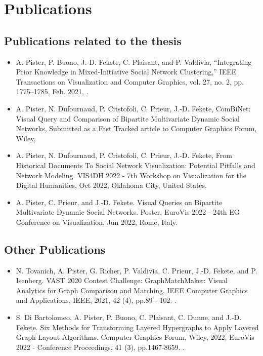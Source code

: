 \chapter*{Publications}

\section*{Publications related to the thesis}

\begin{itemize}
    \item A. Pister, P. Buono, J.-D. Fekete, C. Plaisant, and P. Valdivia, “Integrating Prior Knowledge in Mixed-Initiative Social Network Clustering,” IEEE Transactions on Visualization and Computer Graphics, vol. 27, no. 2, pp. 1775–1785, Feb. 2021, .
    \item A. Pister, N. Dufournaud, P. Cristofoli, C. Prieur, J.-D. Fekete, ComBiNet: Visual Query and Comparison of Bipartite Multivariate Dynamic Social Networks, Submitted as a Fast Tracked article to Computer Graphics Forum, Wiley, 
    \item A. Pister, N. Dufournaud, P. Cristofoli, C. Prieur, J.-D. Fekete, From Historical Documents To Social Network Visualization: Potential Pitfalls and Network Modeling. VIS4DH 2022 - 7th Workshop on Visualization for the Digital Humanities, Oct 2022, Oklahoma City, United States.
    \item  A. Pister, C. Prieur, and J.-D. Fekete. Visual Queries on Bipartite Multivariate Dynamic Social Networks. Poster, EuroVis 2022 - 24th EG Conference on Visualization, Jun 2022, Rome, Italy. 
\end{itemize}


\section*{Other Publications}

\begin{itemize}
    \item N. Tovanich, A. Pister, G. Richer, P. Valdivia, C. Prieur, J.-D. Fekete, and P. Isenberg. VAST 2020 Contest Challenge: GraphMatchMaker: Visual Analytics for Graph Comparison and Matching. IEEE Computer Graphics and Applications, IEEE, 2021, 42 (4), pp.89 - 102. .
    \item S. Di Bartolomeo, A. Pister, P. Buono, C. Plaisant, C. Dunne, and J.-D. Fekete. Six Methods for Transforming Layered Hypergraphs to Apply Layered Graph Layout Algorithms. Computer Graphics Forum, Wiley, 2022, EuroVis 2022 - Conference Proceedings, 41 (3), pp.1467-8659.  .
\end{itemize}
